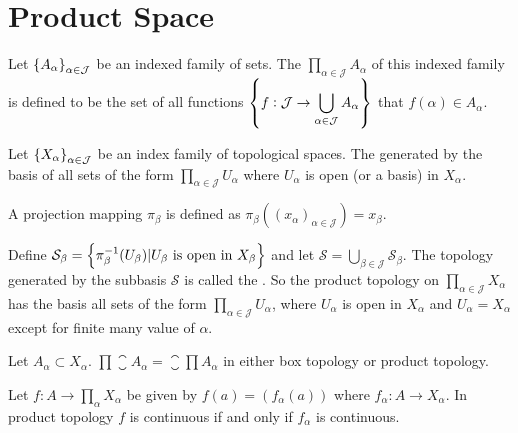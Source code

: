 \section{Product Space}

\begin{definition}
    Let $\set{A_{\alpha}}_{\alpha \in \mathcal{J}}$ be an indexed family of sets. The  $\displaystyle \prod_{\alpha \in \mathcal{J}} A_{\alpha}$ of this indexed family is defined to be the set of all functions $\set{f : \mathcal{J} \rightarrow \displaystyle \bigcup_{\alpha \in \mathcal{J}} A_{\alpha}}$ that $f(\alpha) \in A_{\alpha}$.
\end{definition}

\begin{definition}
    Let $\set{X_{\alpha}}_{\alpha \in \mathcal{J}}$ be an index family of topological spaces. The  generated by the basis of all sets of the form $\displaystyle \prod_{\alpha \in \mathcal{J}} U_{\alpha}$ where $U_{\alpha}$ is open (or a basis) in $X_{\alpha}$. 
\end{definition}

\begin{definition}
    A projection mapping $\pi_\beta$ is defined as $\pi_\beta \left( (x_{\alpha})_{\alpha \in \mathcal{J}} \right) = x_\beta$.
\end{definition}

\begin{definition}
    Define $\mathcal{S}_{\beta} = \set{\pi_{\beta}^{-1}(U_{\beta}) | U_{\beta}\text{ is open in }X_{\beta}}$ and let $\mathcal{S} = \displaystyle \bigcup_{\beta \in \mathcal{J}} \mathcal{S}_{\beta}$. The topology generated by the subbasis $\mathcal{S}$ is called the . So the product topology on $\displaystyle \prod_{\alpha \in \mathcal{J}} X_{\alpha}$ has the basis all sets of the form $\displaystyle \prod_{\alpha \in \mathcal{J}} U_{\alpha}$, where $U_{\alpha}$ is open in $X_{\alpha}$ and $U_{\alpha} = X_{\alpha}$ except for finite many value of $\alpha$.
\end{definition}

\begin{theorem}
Let $A_{\alpha} \subset X_{\alpha}$. $\displaystyle \prod \closure{A_{\alpha}} = \closure{\prod A_{\alpha}}$ in either box topology or product topology.
\end{theorem}


\begin{theorem}
Let $\displaystyle f : A \rightarrow \prod_{\alpha} X_{\alpha}$ be given by $f(a) = \left( f_{\alpha}(a) \right)$ where $f_{\alpha} : A \rightarrow X_{\alpha}$. In product topology $f$ is continuous if and only if $f_{\alpha}$ is continuous.
\end{theorem}

